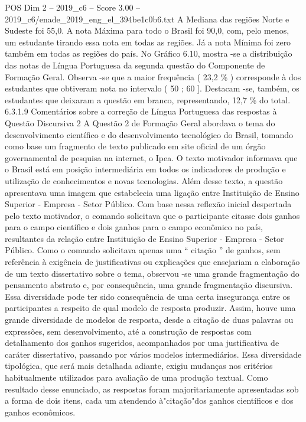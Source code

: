 \begin{textsample}{POS Dim 2 – 2019\_c6 – Score 3.00 – 2019\_c6/enade\_2019\_eng\_el\_394be1c0b6.txt}
A Mediana das regiões Norte e Sudeste foi 55,0.
A nota Máxima para todo o Brasil foi 90,0, com, pelo menos, um estudante tirando essa nota em todas as regiões.
Já a nota Mínima foi zero também em todas as regiões do país.
No Gráfico 6.10, mostra -se a distribuição das notas de Língua Portuguesa da segunda questão do Componente de Formação Geral.
Observa -se que a maior frequência ( 23,2 \% ) corresponde à dos estudantes que obtiveram nota no intervalo ( 50 ; 60 ].
Destacam -se, também, os estudantes que deixaram a questão em branco, representando, 12,7 \% do total. 6.3.1.9 Comentários sobre a correção de Língua Portuguesa das respostas à Questão Discursiva 2 A Questão 2 de Formação Geral abordava o tema do desenvolvimento científico e do desenvolvimento tecnológico do Brasil, tomando como base um fragmento de texto publicado em site oficial de um órgão governamental de pesquisa na internet, o Ipea.
O texto motivador informava que o Brasil está em posição intermediária em todos os indicadores de produção e utilização de conhecimentos e novas tecnologias.
Além desse texto, a questão apresentava uma imagem que estabelecia uma ligação entre Instituição de Ensino Superior - Empresa - Setor Público.
Com base nessa reflexão inicial despertada pelo texto motivador, o comando solicitava que o participante citasse dois ganhos para o campo científico e dois ganhos para o campo econômico no país, resultantes da relação entre Instituição de Ensino Superior - Empresa - Setor Público.
Como o comando solicitava apenas uma “ citação ” de ganhos, sem referência à exigência de justificativas ou explicações que ensejariam a elaboração de um texto dissertativo sobre o tema, observou -se uma grande fragmentação do pensamento abstrato e, por consequência, uma grande fragmentação discursiva.
Essa diversidade pode ter sido consequência de uma certa insegurança entre os participantes a respeito de qual modelo de resposta produzir.
Assim, houve uma grande diversidade de modelos de resposta, desde a citação de duas palavras ou expressões, sem desenvolvimento, até a construção de respostas com detalhamento dos ganhos sugeridos, acompanhados por uma justificativa de caráter dissertativo, passando por vários modelos intermediários.
Essa diversidade tipológica, que será mais detalhada adiante, exigiu mudanças nos critérios habitualmente utilizados para avaliação de uma produção textual.
Como resultado desse enunciado, as respostas foram majoritariamente apresentadas sob a forma de dois itens, cada um atendendo à"citação"dos ganhos científicos e dos ganhos econômicos.

\end{textsample}
